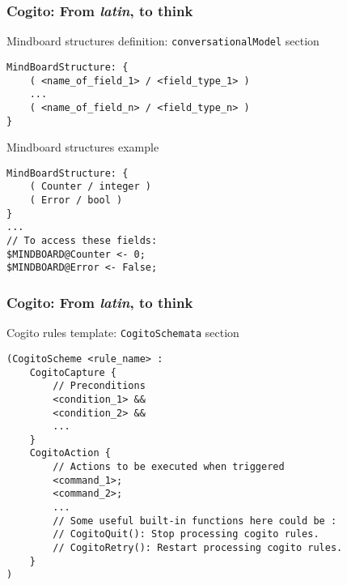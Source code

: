 \documentclass[11pt]{beamer}
\begin{document}
\begin{frame}[fragile]
\frametitle{Cogito: From \emph{latin}, to think}
\begin{block}{Mindboard structures definition: \texttt{conversationalModel} section}
\scriptsize
\begin{lstlisting}[language=lekta]
MindBoardStructure: {
	( <name_of_field_1> / <field_type_1> )
	...
	( <name_of_field_n> / <field_type_n> )
}
\end{lstlisting}
\end{block}
\begin{block}{Mindboard structures example}
\scriptsize
\begin{lstlisting}[language=lekta]
MindBoardStructure: {
	( Counter / integer )
	( Error / bool )
}
...
// To access these fields:
$MINDBOARD@Counter <- 0;
$MINDBOARD@Error <- False;
\end{lstlisting}
\end{block}
\end{frame}

\begin{frame}[fragile]
\frametitle{Cogito: From \emph{latin}, to think}
\begin{block}{Cogito rules template: \texttt{CogitoSchemata} section}
\scriptsize
\begin{lstlisting}[language=lekta]
(CogitoScheme <rule_name> : 
	CogitoCapture {
		// Preconditions 
		<condition_1> &&
		<condition_2> &&
		...
	}
 	CogitoAction {
		// Actions to be executed when triggered
		<command_1>;
		<command_2>;
		...
		// Some useful built-in functions here could be :
		// CogitoQuit(): Stop processing cogito rules.
		// CogitoRetry(): Restart processing cogito rules.
	}
)
\end{lstlisting}
\end{block}
\end{frame}
\end{document}
